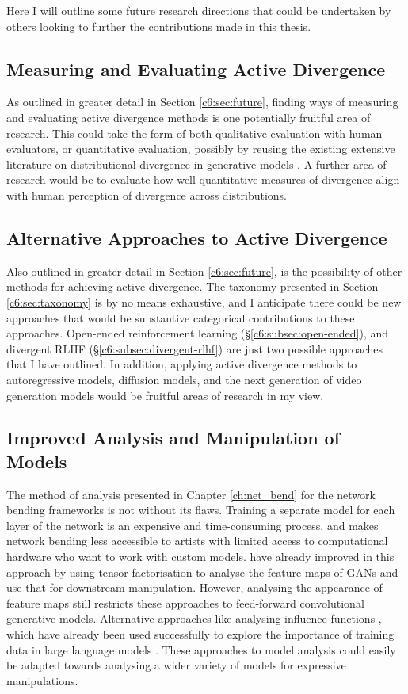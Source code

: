 Here I will outline some future research directions that could be undertaken by others looking to further the contributions made in this thesis.

\subsection{Measuring and Evaluating Active Divergence}
As outlined in greater detail in Section \ref{c6:sec:future}, finding ways of measuring and evaluating active divergence methods is one potentially fruitful area of research.
This could take the form of both qualitative evaluation with human evaluators, or quantitative evaluation, possibly by reusing the existing extensive literature on distributional divergence in generative models \citep{gretton2019interpretable}.
A further area of research would be to evaluate how well quantitative measures of divergence align with human perception of divergence across distributions.

\subsection{Alternative Approaches to Active Divergence}
Also outlined in greater detail in Section \ref{c6:sec:future}, is the possibility of other methods for achieving active divergence. 
The taxonomy presented in Section \ref{c6:sec:taxonomy} is by no means exhaustive, and I anticipate there could be new approaches that would be substantive categorical contributions to these approaches. 
Open-ended reinforcement learning (\S \ref{c6:subsec:open-ended}), and divergent RLHF (\S \ref{c6:subsec:divergent-rlhf}) are just two possible approaches that I have outlined. 
In addition, applying active divergence methods to autoregressive models, diffusion models, and the next generation of video generation models would be fruitful areas of research in my view.

\subsection{Improved Analysis and Manipulation of Models}

The method of analysis presented in Chapter \ref{ch:net_bend} for the network bending frameworks is not without its flaws.
Training a separate model for each layer of the network is an expensive and time-consuming process, and makes network bending less accessible to artists with limited access to computational hardware who want to work with custom models.
\cite{oldfield2022panda,oldfield2024bilinear} have already improved in this approach by using tensor factorisation to analyse the feature maps of GANs and use that for downstream manipulation.
However, analysing the appearance of feature maps still restricts these approaches to feed-forward convolutional generative models.
Alternative approaches like analysing influence functions \citep{koh2017understanding}, which have already been used successfully to explore the importance of training data in large language models \citep{choe2024your}.
These approaches to model analysis could easily be adapted towards analysing a wider variety of models for expressive manipulations.

